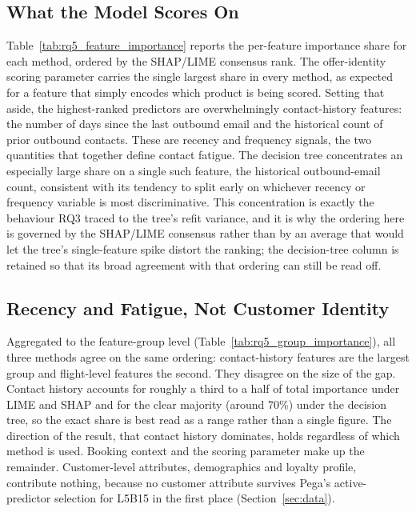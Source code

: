 \documentclass[oneside]{memoir} %
\begin{document}
\subsection{What the Model Scores On}

Table~\ref{tab:rq5_feature_importance} reports the per-feature importance share for each method, ordered by the SHAP/LIME consensus rank. The offer-identity scoring parameter carries the single largest share in every method, as expected for a feature that simply encodes which product is being scored. Setting that aside, the highest-ranked predictors are overwhelmingly contact-history features: the number of days since the last outbound email and the historical count of prior outbound contacts. These are recency and frequency signals, the two quantities that together define contact fatigue. The decision tree concentrates an especially large share on a single such feature, the historical outbound-email count, consistent with its tendency to split early on whichever recency or frequency variable is most discriminative. This concentration is exactly the behaviour RQ3 traced to the tree's refit variance, and it is why the ordering here is governed by the SHAP/LIME consensus rather than by an average that would let the tree's single-feature spike distort the ranking; the decision-tree column is retained so that its broad agreement with that ordering can still be read off.



\subsection{Recency and Fatigue, Not Customer Identity}

Aggregated to the feature-group level (Table~\ref{tab:rq5_group_importance}), all three methods agree on the same ordering: contact-history features are the largest group and flight-level features the second. They disagree on the size of the gap. Contact history accounts for roughly a third to a half of total importance under LIME and SHAP and for the clear majority (around 70\%) under the decision tree, so the exact share is best read as a range rather than a single figure. The direction of the result, that contact history dominates, holds regardless of which method is used. Booking context and the scoring parameter make up the remainder. Customer-level attributes, demographics and loyalty profile, contribute nothing, because no customer attribute survives Pega's active-predictor selection for L5B15 in the first place (Section~\ref{sec:data}).
\end{document}
